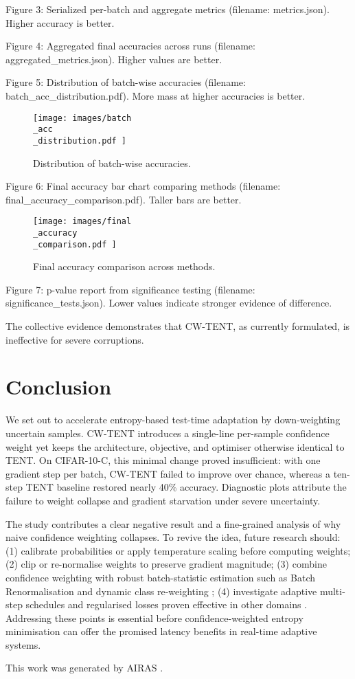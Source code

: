 \documentclass{article} %
\begin{document}
Figure 3: Serialized per-batch and aggregate metrics (filename: metrics.json). Higher accuracy is better.

Figure 4: Aggregated final accuracies across runs (filename: aggregated\_metrics.json). Higher values are better.

Figure 5: Distribution of batch-wise accuracies (filename: batch\_acc\_distribution.pdf). More mass at higher accuracies is better.

\begin{figure}[H]
  \centering
  \texttt{[image:  images/batch\\\_acc\\\_distribution.pdf ]}
  \caption{Distribution of batch-wise accuracies.}
\end{figure}

Figure 6: Final accuracy bar chart comparing methods (filename: final\_accuracy\_comparison.pdf). Taller bars are better.

\begin{figure}[H]
  \centering
  \texttt{[image:  images/final\\\_accuracy\\\_comparison.pdf ]}
  \caption{Final accuracy comparison across methods.}
\end{figure}

Figure 7: p-value report from significance testing (filename: significance\_tests.json). Lower values indicate stronger evidence of difference.

The collective evidence demonstrates that CW-TENT, as currently formulated, is ineffective for severe corruptions.

\section{Conclusion}
\label{sec:conclusion}
We set out to accelerate entropy-based test-time adaptation by down-weighting uncertain samples. CW-TENT introduces a single-line per-sample confidence weight yet keeps the architecture, objective, and optimiser otherwise identical to TENT. On CIFAR-10-C, this minimal change proved insufficient: with one gradient step per batch, CW-TENT failed to improve over chance, whereas a ten-step TENT baseline restored nearly 40\% accuracy. Diagnostic plots attribute the failure to weight collapse and gradient starvation under severe uncertainty.

The study contributes a clear negative result and a fine-grained analysis of why naive confidence weighting collapses. To revive the idea, future research should: (1) calibrate probabilities or apply temperature scaling before computing weights; (2) clip or re-normalise weights to preserve gradient magnitude; (3) combine confidence weighting with robust batch-statistic estimation such as Batch Renormalisation and dynamic class re-weighting \cite{zhao-2023-delta}; (4) investigate adaptive multi-step schedules and regularised losses proven effective in other domains \cite{author-year-test}. Addressing these points is essential before confidence-weighted entropy minimisation can offer the promised latency benefits in real-time adaptive systems.

This work was generated by \textsc{AIRAS} \citep{airas2025}.



\end{document}
